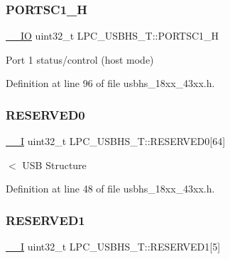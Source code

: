\subsubsection{\texorpdfstring{P\+O\+R\+T\+S\+C1\+\_\+H}{PORTSC1\_H}}
{\footnotesize\ttfamily \hyperlink{core__sc300_8h_aec43007d9998a0a0e01faede4133d6be}{\+\_\+\+\_\+\+IO} uint32\+\_\+t L\+P\+C\+\_\+\+U\+S\+B\+H\+S\+\_\+\+T\+::\+P\+O\+R\+T\+S\+C1\+\_\+H}

Port 1 status/control (host mode) 

Definition at line 96 of file usbhs\+\_\+18xx\+\_\+43xx.\+h.

\mbox{\label{struct_l_p_c___u_s_b_h_s___t_a6a092b621164b742aa31b70bafdc9c94}} 
\subsubsection{\texorpdfstring{R\+E\+S\+E\+R\+V\+E\+D0}{RESERVED0}}
{\footnotesize\ttfamily \hyperlink{core__sc300_8h_af63697ed9952cc71e1225efe205f6cd3}{\+\_\+\+\_\+I} uint32\+\_\+t L\+P\+C\+\_\+\+U\+S\+B\+H\+S\+\_\+\+T\+::\+R\+E\+S\+E\+R\+V\+E\+D0\mbox{[}64\mbox{]}}

$<$ U\+SB Structure 

Definition at line 48 of file usbhs\+\_\+18xx\+\_\+43xx.\+h.

\mbox{\label{struct_l_p_c___u_s_b_h_s___t_a011d6477c5a68b461c971bfe45d34055}} 
\subsubsection{\texorpdfstring{R\+E\+S\+E\+R\+V\+E\+D1}{RESERVED1}}
{\footnotesize\ttfamily \hyperlink{core__sc300_8h_af63697ed9952cc71e1225efe205f6cd3}{\+\_\+\+\_\+I} uint32\+\_\+t L\+P\+C\+\_\+\+U\+S\+B\+H\+S\+\_\+\+T\+::\+R\+E\+S\+E\+R\+V\+E\+D1\mbox{[}5\mbox{]}}



